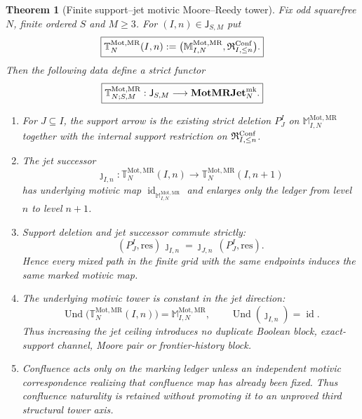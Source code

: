 \documentclass[11pt]{article}
\newtheorem{theorem}{Theorem}[section]
\theoremstyle{remark}
\newcommand{\Mot}{\mathrm{Mot}}
\newcommand{\MR}{\mathrm{MR}}
\begin{document}
\begin{theorem}[Finite support--jet motivic Moore--Reedy tower]
\label{P2M-thm:v34-support-jet-tower}
Fix odd squarefree $N$, finite ordered $S$ and $M\ge3$.  For
$(I,n)\in\mathsf J_{S,M}$ put
\begin{equation}
 \boxed{
 \mathbb T^{\Mot,\MR}_{N}(I,n)
 :=
 \bigl(\mathbb M_{I,N}^{\Mot,\MR},
       \mathfrak R^{\rm Conf}_{I,\le n}\bigr).}
 \label{P2M-eq:v34-two-axis-stage}
\end{equation}
Then the following data define a strict functor
\begin{equation}
 \boxed{
 \mathbb T^{\Mot,\MR}_{N;S,M}:
 \mathsf J_{S,M}\longrightarrow
 \mathbf{MotMRJet}^{\rm mk}_N.}
 \label{P2M-eq:v34-two-axis-functor}
\end{equation}
\begin{enumerate}[label=\textup{(\roman*)}]
\item For $J\subseteq I$, the support arrow is the existing strict deletion
$P_J^I$ on $\mathbb M_{I,N}^{\Mot,\MR}$ together with the internal support
restriction on $\mathfrak R^{\rm Conf}_{I,\le n}$.
\item The jet successor
\[
 \jmath_{I,n}:\mathbb T_N^{\Mot,\MR}(I,n)
 \longrightarrow\mathbb T_N^{\Mot,\MR}(I,n+1)
\]
has underlying motivic map $\operatorname{id}_{\mathbb M_{I,N}^{\Mot,\MR}}$
and enlarges only the ledger from level $n$ to level $n+1$.
\item Support deletion and jet successor commute strictly:
\begin{equation}
 \boxed{
 (P_J^I,\mathrm{res})\,\jmath_{I,n}
 =
 \jmath_{J,n}\,(P_J^I,\mathrm{res}).}
 \label{P2M-eq:v34-support-jet-interchange}
\end{equation}
Hence every mixed path in the finite grid with the same endpoints induces the
same marked motivic map.
\item The underlying motivic tower is constant in the jet direction:
\begin{equation}
 \boxed{
 \operatorname{Und}\bigl(\mathbb T_N^{\Mot,\MR}(I,n)\bigr)
 =\mathbb M_{I,N}^{\Mot,\MR},
 \qquad
 \operatorname{Und}(\jmath_{I,n})=\operatorname{id}.}
 \label{P2M-eq:v34-constant-underlying-jet-axis}
\end{equation}
Thus increasing the jet ceiling introduces no duplicate Boolean block,
exact-support channel, Moore pair or frontier-history block.
\item Confluence acts only on the marking ledger unless an independent
motivic correspondence realizing that confluence map has already been fixed.
Thus confluence naturality is retained without promoting it to an unproved
third structural tower axis.
\end{enumerate}
\end{theorem}
\end{document}
